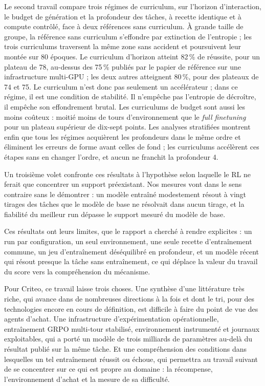 \documentclass[11pt,a4paper]{article}
\begin{document}
Le second travail compare trois régimes de curriculum, sur l'horizon d'interaction, le budget de génération et la profondeur des tâches, à recette identique et à compute contrôlé, face à deux références sans curriculum. À grande taille de groupe, la référence sans curriculum s'effondre par extinction de l'entropie ; les trois curriculums traversent la même zone sans accident et poursuivent leur montée sur 80 époques. Le curriculum d'horizon atteint 82\,\% de réussite, pour un plateau de 78, au-dessus des 75\,\% publiés par le papier de référence sur une infrastructure multi-GPU ; les deux autres atteignent 80\,\%, pour des plateaux de 74 et 75. Le curriculum n'est donc pas seulement un accélérateur ; dans ce régime, il est une condition de stabilité. Il n'empêche pas l'entropie de décroître, il empêche son effondrement brutal. Les curriculums de budget sont aussi les moins coûteux : moitié moins de tours d'environnement que le \emph{full finetuning} pour un plateau supérieur de dix-sept points. Les analyses stratifiées montrent enfin que tous les régimes acquièrent les profondeurs dans le même ordre et éliminent les erreurs de forme avant celles de fond ; les curriculums accélèrent ces étapes sans en changer l'ordre, et aucun ne franchit la profondeur 4.

Un troisième volet confronte ces résultats à l'hypothèse selon laquelle le RL ne ferait que concentrer un support préexistant. Nos mesures vont dans le sens contraire sans le démontrer : un modèle entraîné modestement résout à vingt tirages des tâches que le modèle de base ne résolvait dans aucun tirage, et la fiabilité du meilleur run dépasse le support mesuré du modèle de base. 

Ces résultats ont leurs limites, que le rapport a cherché à rendre explicites : un run par configuration, un seul environnement, une seule recette d'entraînement commune, un jeu d'entraînement déséquilibré en profondeur, et un modèle récent qui résout presque la tâche sans entraînement, ce qui déplace la valeur du travail du score vers la compréhension du mécanisme.






Pour Criteo, ce travail laisse trois choses. Une synthèse d'une littérature très riche, qui avance dans de nombreuses directions à la fois et dont le tri, pour des technologies encore en cours de définition, est difficile à faire du point de vue des agents d'achat. Une infrastructure d'expérimentation opérationnelle, entraînement GRPO multi-tour stabilisé, environnement instrumenté et journaux exploitables, qui a porté un modèle de trois milliards de paramètres au-delà du résultat publié sur la même tâche. Et une compréhension des conditions dans lesquelles un tel entraînement réussit ou échoue, qui permettra au travail suivant de se concentrer sur ce qui est propre au domaine : la récompense, l'environnement d'achat et la mesure de sa difficulté.
\end{document}
